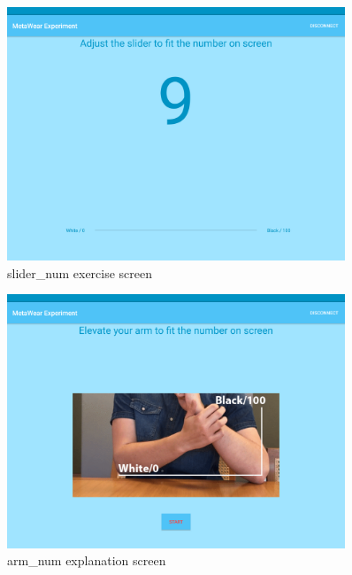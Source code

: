 \begin{figure}[h!]
\centering
\includegraphics[width=0.9\textwidth]{figures/tablet_screen11.png}
\caption{slider\_num exercise screen}
\label{appendix_app_screen_11}
\end{figure}

\begin{figure}[h!]
\centering
\includegraphics[width=0.9\textwidth]{figures/tablet_screen12.png}
\caption{arm\_num explanation screen}
\label{appendix_app_screen_12}
\end{figure}

